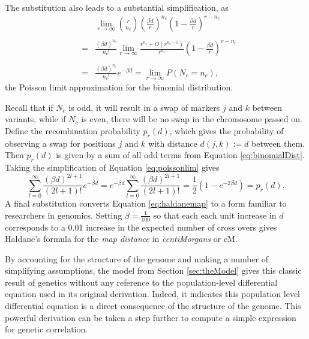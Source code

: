 \documentclass[12pt]{article}
\begin{document}
The substitution also leads to a substantial simplification, as
\begin{eqnarray} \label{eq:poissonlim}
  & & \lim_{r \rightarrow \infty} {r \choose n_c} \left ( \frac{\beta d}{r} \right )^{n_c} \left ( 1-\frac{\beta d}{r} \right )^{r - n_c} \nonumber\\
  & & \nonumber \\
  & = & \frac{(\beta d)^{n_c}}{n_c!} \lim_{r \rightarrow \infty} \frac{r^{n_c} + O(r^{n_c-1})}{r^{n_c}} \left ( 1-\frac{\beta d}{r} \right )^{r - n_c} \nonumber\\
  & & \nonumber \\
  & = & \frac{(\beta d)^{n_c}}{n_c!} e^{-\beta d} = \lim_{r \rightarrow \infty} P(N_c = n_c),
\end{eqnarray}
\noindent the Poisson limit approximation for the binomial distribution.

Recall that if $N_c$ is odd, it will result in a swap of markers $j$ and $k$ between variants, while if $N_c$ is even, there will be no swap in the chromosome passed on. Define the recombination probability $p_r(d)$, which gives the probability of observing a swap for positions $j$ and $k$ with distance $d(j,k) := d$ between them. Then $p_r(d)$ is given by a sum of all odd terms from Equation \ref{eq:binomialDist}. Taking the simplification of Equation \ref{eq:poissonlim} gives
\begin{equation} \label{eq:haldanemap}
  \sum_{l = 0}^{\infty} \frac{(\beta d)^{2l + 1}}{(2l + 1)!} e^{-\beta d} = e^{-\beta d} \sum_{l = 0}^{\infty} \frac{(\beta d)^{2l + 1}}{(2l + 1)!} = \frac{1}{2} \left ( 1 - e^{-2 \beta d} \right ) = p_r(d). 
\end{equation}
A final substitution converts Equation \ref{eq:haldanemap} to a form familiar to researchers in genomics. Setting $\beta = \frac{1}{100}$ so that each each unit increase in $d$ corresponds to a 0.01 increase in the expected number of cross overs gives Haldane's formula for the \textit{map distance} in \textit{centiMorgans} or cM.

By accounting for the structure of the genome and making a number of simplifying assumptions, the model from Section \ref{sec:theModel} gives this classic result of genetics without any reference to the population-level differential equation used in its original derivation. Indeed, it indicates this population level differential equation is a direct consequence of the structure of the genome. This powerful derivation can be taken a step further to compute a simple expression for genetic correlation.
\end{document}

